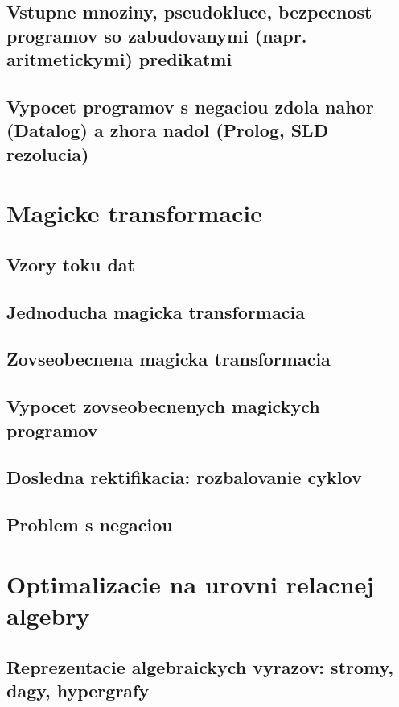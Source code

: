 \documentclass[12pt,a4paper]{article}
\begin{document}
\subsection{Vstupne mnoziny, pseudokluce, bezpecnost programov so zabudovanymi (napr. aritmetickymi) predikatmi}

\subsection{Vypocet programov s negaciou zdola nahor (Datalog) a zhora nadol (Prolog, SLD rezolucia)}

\section{Magicke transformacie}

\subsection{Vzory toku dat}

\subsection{Jednoducha magicka transformacia}

\subsection{Zovseobecnena magicka transformacia}

\subsection{Vypocet zovseobecnenych magickych programov}

\subsection{Dosledna rektifikacia: rozbalovanie cyklov}

\subsection{Problem s negaciou}

\section{Optimalizacie na urovni relacnej algebry}

\subsection{Reprezentacie algebraickych vyrazov: stromy, dagy, hypergrafy}
\end{document}
